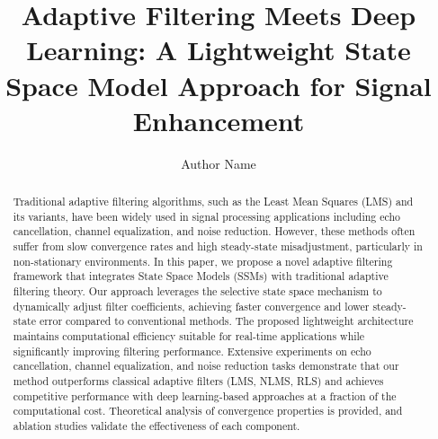 \documentclass[a4paper,fleqn]{cas-sc}
\begin{document}
\let\WriteBookmarks\relax
\def\floatpagepagefraction{1}
\def\textpagefraction{.001}



\title [mode = title]{Adaptive Filtering Meets Deep Learning: A Lightweight State Space Model Approach for Signal Enhancement}

\tnotemark[1]

\tnotetext[1]{}

\author[1]{Author Name}

\cormark[1]

\fnmark[1]


\ead[url]{}




\fntext[1]{}

\begin{abstract}
Traditional adaptive filtering algorithms, such as the Least Mean Squares (LMS) and its variants, have been widely used in signal processing applications including echo cancellation, channel equalization, and noise reduction. However, these methods often suffer from slow convergence rates and high steady-state misadjustment, particularly in non-stationary environments. In this paper, we propose a novel adaptive filtering framework that integrates State Space Models (SSMs) with traditional adaptive filtering theory. Our approach leverages the selective state space mechanism to dynamically adjust filter coefficients, achieving faster convergence and lower steady-state error compared to conventional methods. The proposed lightweight architecture maintains computational efficiency suitable for real-time applications while significantly improving filtering performance. Extensive experiments on echo cancellation, channel equalization, and noise reduction tasks demonstrate that our method outperforms classical adaptive filters (LMS, NLMS, RLS) and achieves competitive performance with deep learning-based approaches at a fraction of the computational cost. Theoretical analysis of convergence properties is provided, and ablation studies validate the effectiveness of each component.
\end{abstract}
\end{document}
